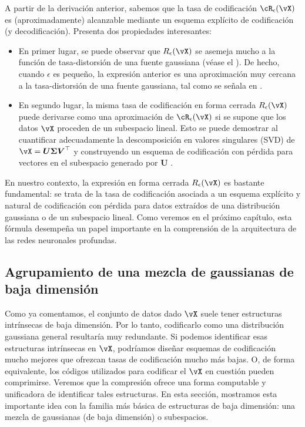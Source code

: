 \documentclass[../../book-main.tex]{subfiles}
\begin{document}
A partir de la derivación anterior, sabemos que la tasa de codificación
$\cR_{\epsilon}(\vX)$ es (aproximadamente) alcanzable mediante un esquema explícito
de codificación (y decodificación). Presenta dos propiedades interesantes:
\begin{itemize}
    \item En primer lugar, se puede observar que $R_{\epsilon}(\vX)$ se asemeja mucho
        a la función de tasa-distorsión de una fuente gaussiana
        \cite{Cover-Thomas} (véase el ). De hecho,
        cuando $\epsilon$ es pequeño, la expresión anterior es una aproximación
        muy cercana a la tasa-distorsión de una fuente gaussiana, tal como
        se señala en   \cite{MaY2007-PAMI}. 
    \item En segundo lugar, la misma tasa de codificación en forma cerrada $R_{\epsilon}(\vX)$
        puede derivarse como una aproximación de \(\cR_{\epsilon}(\vX)\)
        si se supone que los datos $\vX$ proceden de un subespacio lineal.
        Esto se puede demostrar al cuantificar adecuadamente la descomposición en valores singulares
        (SVD) de $\vX = \boldsymbol{U}
        \boldsymbol{\Sigma}\boldsymbol{V}^\top$ y construyendo un
        esquema de codificación con pérdida para vectores en el subespacio generado por
        $\boldsymbol{U}$ \cite{MaY2007-PAMI}. 
\end{itemize}
En nuestro contexto, la expresión en forma cerrada $R_{\epsilon}(\vX)$ es
bastante fundamental: se trata de la tasa de codificación asociada a un esquema explícito y natural de codificación con pérdida 
para datos extraídos de una distribución gaussiana
o de un subespacio lineal. Como veremos en el próximo
capítulo, esta fórmula desempeña un papel importante en la comprensión de la
arquitectura de las redes neuronales profundas.

\subsection{Agrupamiento de una mezcla de gaussianas de baja dimensión}
\label{sec:clustering-Gaussians}
Como ya comentamos, el conjunto de datos dado $\vX$ suele tener
estructuras intrínsecas de baja dimensión. Por lo tanto, codificarlo como una distribución
gaussiana general resultaría muy redundante. Si podemos identificar esas estructuras intrínsecas
en $\vX$, podríamos diseñar esquemas de codificación mucho mejores que
ofrezcan tasas de codificación mucho más bajas. O, de forma equivalente, los códigos utilizados para
codificar el $\vX$ en cuestión pueden comprimirse. Veremos que la compresión
ofrece una forma computable y unificadora de identificar tales estructuras. En esta
sección, mostramos esta importante idea con la familia más básica
de estructuras de baja dimensión: una mezcla de gaussianas (de baja dimensión)
o subespacios.
\end{document}
